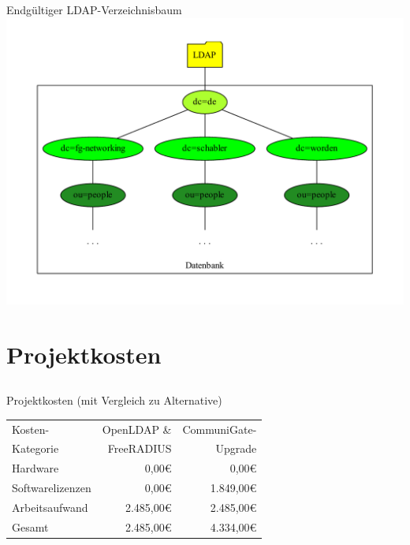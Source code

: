 \documentclass[handout,svgnames]{beamer}
\newcommand{\mcc}[2]{\multicolumn{#1}{|c|}{#2}} %
\begin{document}
\begin{frame}{Endgültiger LDAP-Verzeichnisbaum}
		\includegraphics[width=\textwidth]{Bilder/LDAP-fgn.pdf}
\end{frame}


\section{Projektkosten}
\subsection{}
\begin{frame}{Projektkosten (mit Vergleich zu Alternative)}
	\begin{tabularx}{0.8\textwidth}{|X|r|r|}
		\hline
		Kosten-	&	OpenLDAP \& &	CommuniGate-\\
		Kategorie	&	FreeRADIUS &	Upgrade\\
		\hline
		Hardware &	0,00\euro{} &	0,00\euro{}\\
		\hline
		Softwarelizenzen &	0,00\euro{} &	1.849,00\euro{}\\
		\hline
		Arbeitsaufwand &	2.485,00\euro{} &	2.485,00\euro{}\\
		\hhline{|=|=|=|}
		Gesamt &	2.485,00\euro{} &	4.334,00\euro{}\\
		\hline
	\end{tabularx}
\end{frame}
\end{document}
